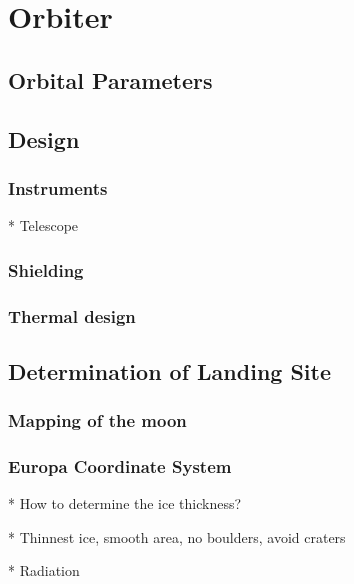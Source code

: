 \chapter{Orbiter}

\section{Orbital Parameters}

\section{Design}

\subsection{Instruments}

* Telescope

\subsection{Shielding}

\subsection{Thermal design}

\section{Determination of Landing Site}

\subsection{Mapping of the moon}

\subsection{Europa Coordinate System}

* How to determine the ice thickness?

* Thinnest ice, smooth area, no boulders, avoid craters

* Radiation

